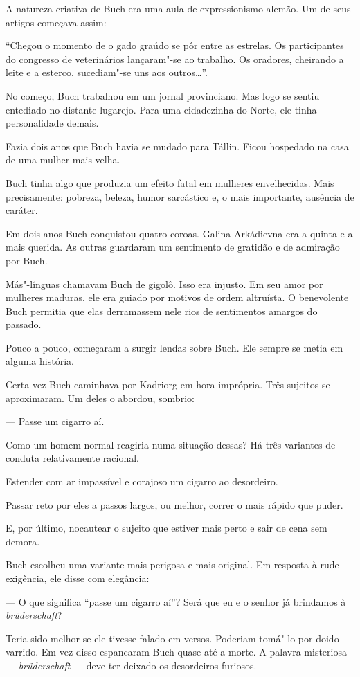 A natureza criativa de Buch era uma aula de expressionismo alemão. Um de
seus artigos começava assim:

``Chegou o momento de o gado graúdo se pôr entre as estrelas. Os
participantes do congresso de veterinários lançaram"-se ao trabalho. Os
oradores, cheirando a leite e a esterco, sucediam"-se uns aos
outros\ldots{}''.

No começo, Buch trabalhou em um jornal provinciano. Mas logo se sentiu
entediado no distante lugarejo. Para uma cidadezinha do Norte, ele tinha
personalidade demais.

Fazia dois anos que Buch havia se mudado para Tállin. Ficou hospedado na
casa de uma mulher mais velha.

Buch tinha algo que produzia um efeito fatal em mulheres envelhecidas.
Mais precisamente: pobreza, beleza, humor sarcástico e, o mais
importante, ausência de caráter.

Em dois anos Buch conquistou quatro coroas. Galina Arkádievna era a
quinta e a mais querida. As outras guardaram um sentimento de gratidão e
de admiração por Buch.

Más"-línguas chamavam Buch de gigolô. Isso era injusto. Em seu amor por
mulheres maduras, ele era guiado por motivos de ordem altruísta. O
benevolente Buch permitia que elas derramassem nele rios de sentimentos
amargos do passado.

Pouco a pouco, começaram a surgir lendas sobre Buch. Ele sempre se metia
em alguma história.

Certa vez Buch caminhava por Kadriorg em hora imprópria. Três sujeitos
se aproximaram. Um deles o abordou, sombrio:

--- Passe um cigarro aí.

Como um homem normal reagiria numa situação dessas? Há três variantes de
conduta relativamente racional.

Estender com ar impassível e corajoso um cigarro ao desordeiro.

Passar reto por eles a passos largos, ou melhor, correr o mais rápido
que puder.

E, por último, nocautear o sujeito que estiver mais perto e sair de cena
sem demora.

Buch escolheu uma variante mais perigosa e mais original. Em resposta à
rude exigência, ele disse com elegância:

--- O que significa ``passe um cigarro aí''? Será que eu e o senhor já
brindamos à \emph{brüderschaft}?

Teria sido melhor se ele tivesse falado em versos. Poderiam tomá"-lo por
doido varrido. Em vez disso espancaram Buch quase até a morte. A palavra
misteriosa --- \emph{brüderschaft} --- deve ter deixado os desordeiros
furiosos.

